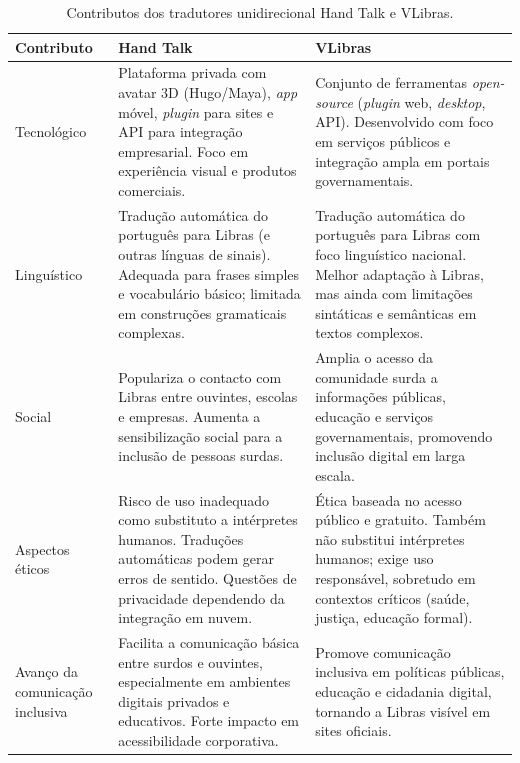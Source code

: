 \documentclass[portuguese]{textolivre}
\begin{document}
\begin{table}[htbp]
\centering
\small
\caption{Contributos dos tradutores unidirecional Hand Talk e VLibras.}
\label{tab4}
\begin{threeparttable}

\begin{tabularx}{\textwidth}{@{}>{\raggedright\arraybackslash}p{2.8cm}
>{\raggedright\arraybackslash}X
>{\raggedright\arraybackslash}X@{}}

\toprule
Contributo &
Hand Talk &
VLibras \\
\midrule

Tecnológico &
Plataforma privada com avatar 3D (Hugo/Maya), \textit{app} móvel, \textit{plugin} para sites e API para integração empresarial. Foco em experiência visual e produtos comerciais. &
Conjunto de ferramentas \textit{open-source} (\textit{plugin} web, \textit{desktop}, API). Desenvolvido com foco em serviços públicos e integração ampla em portais governamentais. \\

\addlinespace

Linguístico &
Tradução automática do português para Libras (e outras línguas de sinais). Adequada para frases simples e vocabulário básico; limitada em construções gramaticais complexas. &
Tradução automática do português para Libras com foco linguístico nacional. Melhor adaptação à Libras, mas ainda com limitações sintáticas e semânticas em textos complexos. \\

\addlinespace

Social &
Populariza o contacto com Libras entre ouvintes, escolas e empresas. Aumenta a sensibilização social para a inclusão de pessoas surdas. &
Amplia o acesso da comunidade surda a informações públicas, educação e serviços governamentais, promovendo inclusão digital em larga escala. \\

\addlinespace

Aspectos éticos &
Risco de uso inadequado como substituto a intérpretes humanos. Traduções automáticas podem gerar erros de sentido. Questões de privacidade dependendo da integração em nuvem. &
Ética baseada no acesso público e gratuito. Também não substitui intérpretes humanos; exige uso responsável, sobretudo em contextos críticos (saúde, justiça, educação formal). \\

\addlinespace

Avanço da comunicação inclusiva &
Facilita a comunicação básica entre surdos e ouvintes, especialmente em ambientes digitais privados e educativos. Forte impacto em acessibilidade corporativa. &
Promove comunicação inclusiva em políticas públicas, educação e cidadania digital, tornando a Libras visível em sites oficiais. \\


\end{tabularx}
\end{threeparttable}
\end{table}
\end{document}
